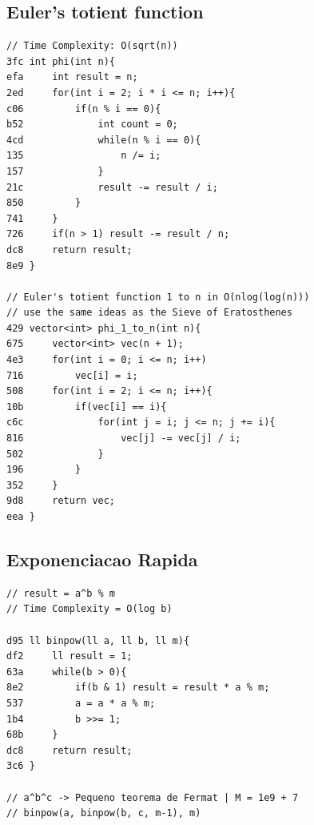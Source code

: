 \documentclass[11pt, a4paper, twoside]{article}
\begin{document}
\subsection{Euler's totient function}
\begin{lstlisting}
// Time Complexity: O(sqrt(n))
3fc int phi(int n){
efa     int result = n;
2ed     for(int i = 2; i * i <= n; i++){
c06         if(n % i == 0){
b52             int count = 0;
4cd             while(n % i == 0){
135                 n /= i;
157             }
21c             result -= result / i;
850         }
741     }
726     if(n > 1) result -= result / n;
dc8     return result;
8e9 }

// Euler's totient function 1 to n in O(nlog(log(n)))
// use the same ideas as the Sieve of Eratosthenes
429 vector<int> phi_1_to_n(int n){
675     vector<int> vec(n + 1);
4e3     for(int i = 0; i <= n; i++) 
716         vec[i] = i;
508     for(int i = 2; i <= n; i++){
10b         if(vec[i] == i){
c6c             for(int j = i; j <= n; j += i){
816                 vec[j] -= vec[j] / i;
502             }
196         }
352     }
9d8     return vec;
eea }
\end{lstlisting}

\subsection{Exponenciacao Rapida}
\begin{lstlisting}
// result = a^b % m 
// Time Complexity = O(log b)

d95 ll binpow(ll a, ll b, ll m){
df2     ll result = 1;
63a     while(b > 0){
8e2         if(b & 1) result = result * a % m;
537         a = a * a % m;
1b4         b >>= 1;
68b     }
dc8     return result;
3c6 }

// a^b^c -> Pequeno teorema de Fermat | M = 1e9 + 7
// binpow(a, binpow(b, c, m-1), m)
\end{lstlisting}
\end{document}
